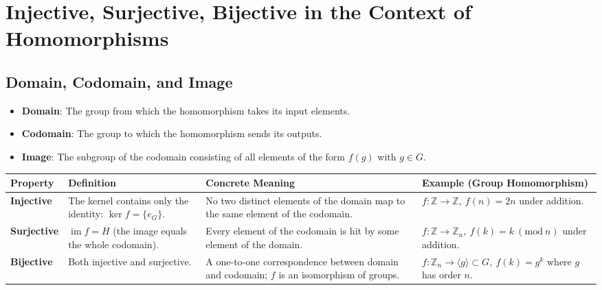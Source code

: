 \documentclass[12pt]{article}
\begin{document}
\section*{Injective, Surjective, Bijective in the Context of Homomorphisms}

\subsection*{Domain, Codomain, and Image}

\begin{itemize}
	\item \textbf{Domain}: The group from which the homomorphism takes its input elements.
	\item \textbf{Codomain}: The group to which the homomorphism sends its outputs.
	\item \textbf{Image}: The subgroup of the codomain consisting of all elements of the form \( f(g) \) with \( g \in G \).
\end{itemize}

\bigskip

\begin{center}
	\begin{tabular}{| >{\raggedright\arraybackslash}m{2.8cm} 
			| >{\raggedright\arraybackslash}m{4.8cm} 
			| >{\raggedright\arraybackslash}m{6.5cm} 
			| >{\raggedright\arraybackslash}m{4.5cm} |}
		\hline
		\textbf{Property} & \textbf{Definition} & \textbf{Concrete Meaning} & \textbf{Example (Group Homomorphism)} \\
		\hline
		
		\textbf{Injective} & The kernel contains only the identity: \( \ker f = \{e_G\} \). 
		& No two distinct elements of the domain map to the same element of the codomain. 
		& \( f : \mathbb{Z} \to \mathbb{Z},\ f(n) = 2n \) under addition. \\
		
		\hline
		
		\textbf{Surjective} & \( \operatorname{im} f = H \) (the image equals the whole codomain). 
		& Every element of the codomain is hit by some element of the domain. 
		& \( f : \mathbb{Z} \to \mathbb{Z}_n,\ f(k) = k \ (\mathrm{mod}\ n) \) under addition. \\
		
		\hline
		
		\textbf{Bijective} & Both injective and surjective. 
		& A one-to-one correspondence between domain and codomain; \( f \) is an isomorphism of groups. 
		& \( f : \mathbb{Z}_n \to \langle g \rangle \subset G,\ f(k) = g^k \) where \( g \) has order \( n \). \\
		
		\hline
	\end{tabular}
\end{center}
\end{document}
